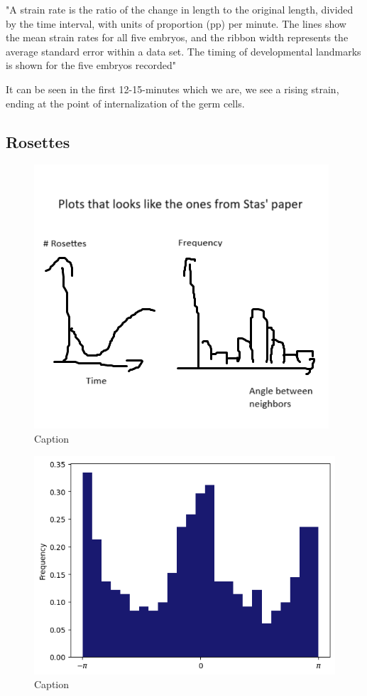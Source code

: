 "A strain rate is the ratio of the change in length to the original length, divided by the time interval, with units of proportion (pp) per minute. The lines show the mean strain rates for all five embryos, and the ribbon width represents the average standard error within a data set. The timing of developmental landmarks is shown for the five embryos recorded"

It can be seen in the first 12-15-minutes which we are, we see a rising strain, ending at the point of internalization of the germ cells. 

\subsection{Rosettes}
\begin{figure}[H]
    \centering
    \includegraphics[width=0.8\linewidth]{chapters/Results/figures/rosettes_placeholder.png}
    \caption{Caption}
    \label{fig:enter-label}
\end{figure}

\begin{figure}[H]
    \centering
    \includegraphics[width=0.6\linewidth]{chapters/Results/figures/rosettes_angle_dist.png}
    \caption{Caption}
    \label{fig:enter-label}
\end{figure}
